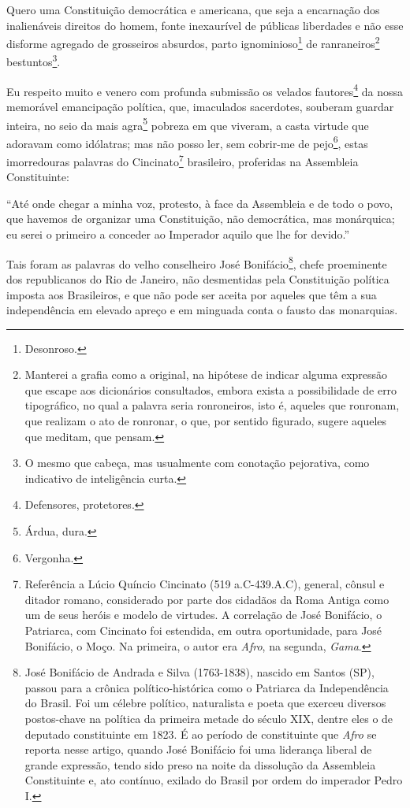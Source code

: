 Quero uma Constituição democrática e americana, que seja a encarnação
dos inalienáveis direitos do homem, fonte inexaurível de públicas
liberdades e não esse disforme agregado de grosseiros absurdos, parto
ignominioso\footnote{Desonroso.} de ranraneiros\footnote{Manterei a
  grafia como a original, na hipótese de indicar alguma expressão que
  escape aos dicionários consultados, embora exista a possibilidade de
  erro tipográfico, no qual a palavra seria ronroneiros, isto é, aqueles
  que ronronam, que realizam o ato de ronronar, o que, por sentido
  figurado, sugere aqueles que meditam, que pensam.}
bestuntos\footnote{O mesmo que cabeça, mas usualmente com conotação
  pejorativa, como indicativo de inteligência curta.}.

Eu respeito muito e venero com profunda submissão os velados
fautores\footnote{Defensores, protetores.} da nossa memorável
emancipação política, que, imaculados sacerdotes, souberam guardar
inteira, no seio da mais agra\footnote{Árdua, dura.} pobreza em que
viveram, a casta virtude que adoravam como idólatras; mas não posso ler,
sem cobrir-me de pejo\footnote{Vergonha.}, estas imorredouras palavras
do Cincinato\footnote{Referência a Lúcio Quíncio Cincinato (519
  a.C-439.A.C), general, cônsul e ditador romano, considerado por parte
  dos cidadãos da Roma Antiga como um de seus heróis e modelo de
  virtudes. A correlação de José Bonifácio, o Patriarca, com Cincinato
  foi estendida, em outra oportunidade, para José Bonifácio, o Moço. Na
  primeira, o autor era \emph{Afro}, na segunda, \emph{Gama}.}
brasileiro, proferidas na Assembleia Constituinte:

``Até onde chegar a minha voz, protesto, à face da Assembleia e de todo o
povo, que havemos de organizar uma Constituição, não democrática, mas
monárquica; eu serei o primeiro a conceder ao Imperador aquilo que lhe
for devido.''

Tais foram as palavras do velho conselheiro José Bonifácio\footnote{
  José Bonifácio de Andrada e Silva (1763-1838), nascido em Santos (SP),
  passou para a crônica político-histórica como o Patriarca da
  Independência do Brasil. Foi um célebre político, naturalista e poeta
  que exerceu diversos postos-chave na política da primeira metade do
  século XIX, dentre eles o de deputado constituinte em 1823. É ao
  período de constituinte que \emph{Afro} se reporta nesse artigo,
  quando José Bonifácio foi uma liderança liberal de grande expressão,
  tendo sido preso na noite da dissolução da Assembleia Constituinte e,
  ato contínuo, exilado do Brasil por ordem do imperador Pedro I.},
chefe proeminente dos republicanos do Rio de Janeiro, não desmentidas
pela Constituição política imposta aos Brasileiros, e que não pode ser
aceita por aqueles que têm a sua independência em elevado apreço e em
minguada conta o fausto das monarquias.

